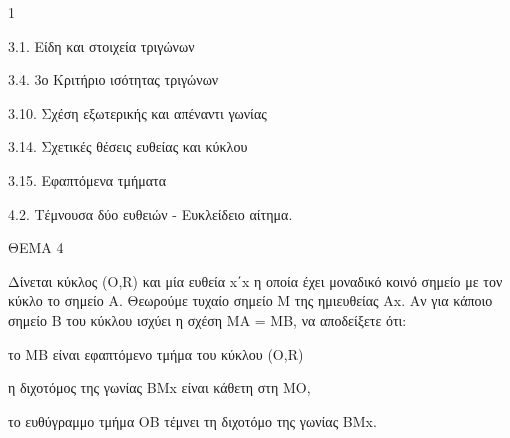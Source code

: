 \begin{ylh}{1}
    \item 3.1. Είδη και στοιχεία τριγώνων
    \item 3.4. 3ο Κριτήριο ισότητας τριγώνων
    \item 3.10. Σχέση εξωτερικής και απέναντι γωνίας
    \item 3.14. Σχετικές θέσεις ευθείας και κύκλου
    \item 3.15. Εφαπτόμενα τμήματα
    \item 4.2. Τέμνουσα δύο ευθειών - Ευκλείδειο αίτημα.
\end{ylh}

ΘΕΜΑ 4

Δίνεται κύκλος (Ο,R) και μία ευθεία x΄x η οποία έχει μοναδικό κοινό σημείο με τον κύκλο το σημείο Α. Θεωρούμε τυχαίο σημείο Μ της ημιευθείας Αx. Aν για κάποιο σημείο Β του κύκλου ισχύει η σχέση ΜΑ = ΜΒ, να αποδείξετε ότι:

\begin{alist}
\item το ΜΒ είναι εφαπτόμενο τμήμα του κύκλου (Ο,R) 

\item η διχοτόμος της γωνίας ΒΜx είναι κάθετη στη ΜΟ, 

\item το ευθύγραμμο τμήμα ΟΒ τέμνει τη διχοτόμο της γωνίας ΒΜx. 
\end{alist}
